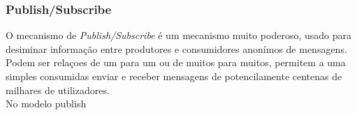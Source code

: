\subsubsection{Publish/Subscribe}
O mecanismo  de \textit{Publish/Subscribe} é um mecanismo muito poderoso, usado para desiminar informação entre produtores e consumidores anonímos de mensagens. Podem ser relaçoes de um para um ou de muitos para muitos, permitem a uma simples consumidas enviar e receber mensagens de potencilamente centenas de milhares de utilizadores. \\
No modelo publish


